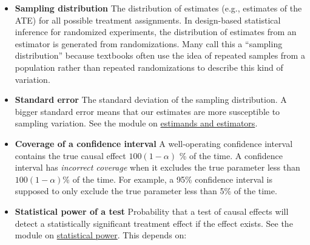 \documentclass[12pt,]{book}
\begin{document}
\begin{itemize}
\item
  \textbf{Sampling distribution} The distribution of estimates (e.g., estimates of the ATE) for all possible treatment assignments. In design-based statistical inference for randomized experiments, the distribution of estimates from an estimator is generated from randomizations. Many call this a ``sampling distribution'' because textbooks often use the idea of repeated samples from a population rather than repeated randomizations to describe this kind of variation.
\item
  \textbf{Standard error} The standard deviation of the sampling distribution. A bigger standard error means that our estimates are more susceptible to sampling variation. See the module on \href{estimands-and-estimators.html}{estimands and estimators}.
\item
  \textbf{Coverage of a confidence interval} A well-operating confidence interval
  contains the true causal effect \(100 ( 1 - \alpha)\) \% of the time. A
  confidence interval has \emph{incorrect coverage} when it excludes the true
  parameter less than \(100 (1 - \alpha)\)\% of the time. For example, a 95\%
  confidence interval is supposed to only exclude the true parameter less than
  5\% of the time.
\item
  \textbf{Statistical power of a test} Probability that a test of causal effects
  will detect a statistically significant treatment effect if the effect
  exists. See the module on \href{statistical-power-and-design-diagnosands.html}{statistical power}. This depends on:


\end{itemize}
\end{document}
